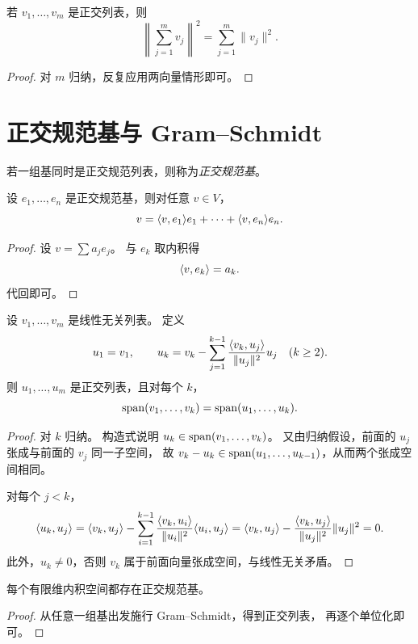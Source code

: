 \begin{corollary}
若 $v_1,\dots,v_m$ 是正交列表，则
\[
\left\|\sum_{j=1}^m v_j\right\|^2=\sum_{j=1}^m\|v_j\|^2.
\]
\end{corollary}

\begin{proof}
对 $m$ 归纳，反复应用两向量情形即可。
\end{proof}

\section{正交规范基与 Gram--Schmidt}

\begin{definition}
若一组基同时是正交规范列表，则称为\emph{正交规范基}。
\end{definition}

\begin{proposition}
设 $e_1,\dots,e_n$ 是正交规范基，则对任意 $v\in V$，
\[
v=\langle v, e_1 \rangle e_1+\cdots+\langle v, e_n \rangle e_n.
\]
\end{proposition}

\begin{proof}
设 $v=\sum a_je_j$。
与 $e_k$ 取内积得
\[
\langle v, e_k \rangle=a_k.
\]
代回即可。
\end{proof}

\begin{theorem}
设 $v_1,\dots,v_m$ 是线性无关列表。
定义
\[
u_1=v_1,
\qquad
u_k=v_k-\sum_{j=1}^{k-1}\frac{\langle v_k, u_j \rangle}{\|u_j\|^2}u_j
\quad (k\ge 2).
\]
则 $u_1,\dots,u_m$ 是正交列表，且对每个 $k$，
\[
\operatorname{span}(v_1,\dots,v_k)=\operatorname{span}(u_1,\dots,u_k).
\]
\end{theorem}

\begin{proof}
对 $k$ 归纳。
构造式说明 $u_k\in\operatorname{span}(v_1,\dots,v_k)$。
又由归纳假设，前面的 $u_j$ 张成与前面的 $v_j$ 同一子空间，
故 $v_k-u_k\in\operatorname{span}(u_1,\dots,u_{k-1})$，从而两个张成空间相同。

对每个 $j<k$，
\[
\langle u_k, u_j \rangle
=
\langle v_k, u_j \rangle-\sum_{i=1}^{k-1}\frac{\langle v_k, u_i \rangle}{\|u_i\|^2}\langle u_i, u_j \rangle
=
\langle v_k, u_j \rangle-\frac{\langle v_k, u_j \rangle}{\|u_j\|^2}\|u_j\|^2=0.
\]
此外，$u_k\neq 0$，否则 $v_k$ 属于前面向量张成空间，与线性无关矛盾。
\end{proof}

\begin{corollary}
每个有限维内积空间都存在正交规范基。
\end{corollary}

\begin{proof}
从任意一组基出发施行 Gram--Schmidt，得到正交列表，
再逐个单位化即可。
\end{proof}

